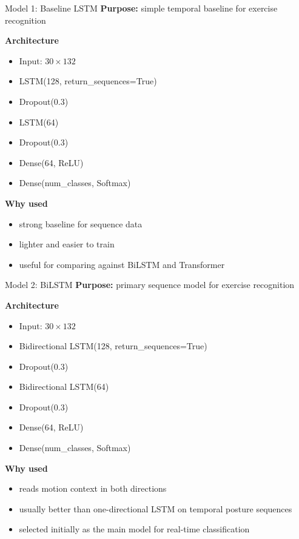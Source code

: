 \documentclass[aspectratio=169]{beamer}
\begin{document}
\begin{frame}{Model 1: Baseline LSTM}
\small
\textbf{Purpose:} simple temporal baseline for exercise recognition

\vspace{0.2cm}
\textbf{Architecture}
\begin{itemize}
  \item Input: \(30 \times 132\)
  \item LSTM(128, return\_sequences=True)
  \item Dropout(0.3)
  \item LSTM(64)
  \item Dropout(0.3)
  \item Dense(64, ReLU)
  \item Dense(num\_classes, Softmax)
\end{itemize}

\vspace{0.2cm}
\textbf{Why used}
\begin{itemize}
  \item strong baseline for sequence data
  \item lighter and easier to train
  \item useful for comparing against BiLSTM and Transformer
\end{itemize}
\end{frame}

\begin{frame}{Model 2: BiLSTM}
\small
\textbf{Purpose:} primary sequence model for exercise recognition

\vspace{0.2cm}
\textbf{Architecture}
\begin{itemize}
  \item Input: \(30 \times 132\)
  \item Bidirectional LSTM(128, return\_sequences=True)
  \item Dropout(0.3)
  \item Bidirectional LSTM(64)
  \item Dropout(0.3)
  \item Dense(64, ReLU)
  \item Dense(num\_classes, Softmax)
\end{itemize}

\vspace{0.2cm}
\textbf{Why used}
\begin{itemize}
  \item reads motion context in both directions
  \item usually better than one-directional LSTM on temporal posture sequences
  \item selected initially as the main model for real-time classification
\end{itemize}
\end{frame}
\end{document}
